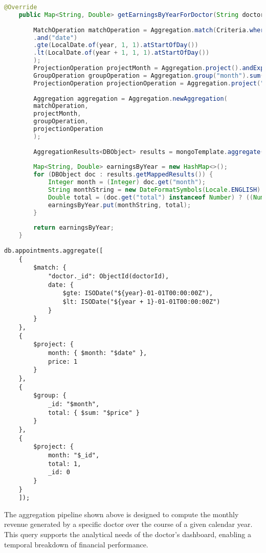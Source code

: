 \begin{lstlisting}[language=java]
	@Override
	public Map<String, Double> getEarningsByYearForDoctor(String doctorId, Integer year) {
		
		MatchOperation matchOperation = Aggregation.match(Criteria.where("doctor.id").is(doctorId)
		.and("date")
		.gte(LocalDate.of(year, 1, 1).atStartOfDay())
		.lt(LocalDate.of(year + 1, 1, 1).atStartOfDay())
		);
		ProjectionOperation projectMonth = Aggregation.project().andExpression("month(date)").as("month").and("price").as("price");
		GroupOperation groupOperation = Aggregation.group("month").sum("price").as("total");
		ProjectionOperation projectionOperation = Aggregation.project("total").and("month").previousOperation();
		
		Aggregation aggregation = Aggregation.newAggregation(
		matchOperation,
		projectMonth,
		groupOperation,
		projectionOperation
		);
		
		AggregationResults<DBObject> results = mongoTemplate.aggregate(aggregation, Appointment.class, DBObject.class);
		
		Map<String, Double> earningsByYear = new HashMap<>();
		for (DBObject doc : results.getMappedResults()) {
			Integer month = (Integer) doc.get("month");
			String monthString = new DateFormatSymbols(Locale.ENGLISH).getMonths()[month-1].toLowerCase();
			Double total = (doc.get("total") instanceof Number) ? ((Number) doc.get("total")).doubleValue() : null;
			earningsByYear.put(monthString, total);
		}
		
		return earningsByYear;
	}
\end{lstlisting}

\begin{lstlisting}[language=mongodb]
	db.appointments.aggregate([
	{
		$match: {
			"doctor._id": ObjectId(doctorId),
			date: {
				$gte: ISODate("${year}-01-01T00:00:00Z"),
				$lt: ISODate("${year + 1}-01-01T00:00:00Z")
			}
		}
	},
	{
		$project: {
			month: { $month: "$date" },
			price: 1
		}
	},
	{
		$group: {
			_id: "$month",
			total: { $sum: "$price" }
		}
	},
	{
		$project: {
			month: "$_id",
			total: 1,
			_id: 0
		}
	}
	]); 
\end{lstlisting}

The aggregation pipeline shown above is designed to compute the monthly revenue generated by a specific doctor over the course of a given calendar year. This query supports the analytical needs of the doctor's dashboard, enabling a temporal breakdown of financial performance.

